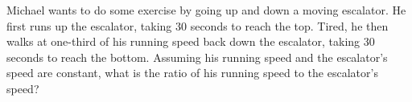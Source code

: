 Michael wants to do some exercise by going up and down a moving escalator. He first runs up the escalator, taking $30$ seconds to reach the top. Tired, he then walks at one-third of his running speed back down the escalator, taking 30 seconds to reach the bottom. Assuming his running speed and the escalator's speed are constant, what is the ratio of his running speed to the escalator's speed?

